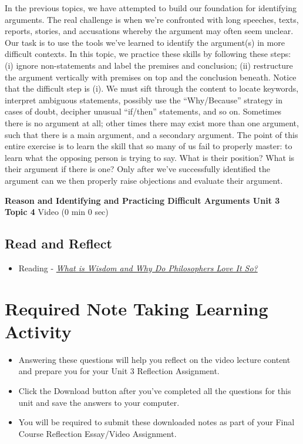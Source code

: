 \documentclass[
]{book}
\providecommand{\tightlist}{%
  \setlength{\itemsep}{0pt}\setlength{\parskip}{0pt}}
\begin{document}
In the previous topics, we have attempted to build our foundation for identifying arguments. The real challenge is when we're confronted with long speeches, texts, reports, stories, and accusations whereby the argument may often seem unclear. Our task is to use the tools we've learned to identify the argument(s) in more difficult contexts. In this topic, we practice these skills by following these steps: (i) ignore non-statements and label the premises and conclusion; (ii) restructure the argument vertically with premises on top and the conclusion beneath. Notice that the difficult step is (i). We must sift through the content to locate keywords, interpret ambiguous statements, possibly use the ``Why/Because'' strategy in cases of doubt, decipher unusual ``if/then'' statements, and so on. Sometimes there is no argument at all; other times there may exist more than one argument, such that there is a main argument, and a secondary argument. The point of this entire exercise is to learn the skill that so many of us fail to properly master: to learn what the opposing person is trying to say. What is their position? What is their argument if there is one? Only after we've successfully identified the argument can we then properly raise objections and evaluate their argument.

\textbf{Reason and Identifying and Practicing Difficult Arguments Unit 3 Topic 4} Video (0 min 0 sec)

\hypertarget{read-and-reflect-10}{%
\subsection*{Read and Reflect}\label{read-and-reflect-10}}

\begin{itemize}
\tightlist
\item
  Reading - \href{assets/u1/PHIL-100-Nozick-What-is-Wisdom.pdf}{\emph{What is Wisdom and Why Do Philosophers Love It So?}}
\end{itemize}

\hypertarget{required-note-taking-learning-activity-2}{%
\section*{Required Note Taking Learning Activity}\label{required-note-taking-learning-activity-2}}

\begin{reflect}
\begin{itemize}
\tightlist
\item
  Answering these questions will help you reflect on the video lecture content and prepare you for your Unit 3 Reflection Assignment.
\item
  Click the Download button after you've completed all the questions for this unit and save the answers to your computer.
\item
  You will be required to submit these downloaded notes as part of your Final Course Reflection Essay/Video Assignment.
\end{itemize}
\end{reflect}
\end{document}
